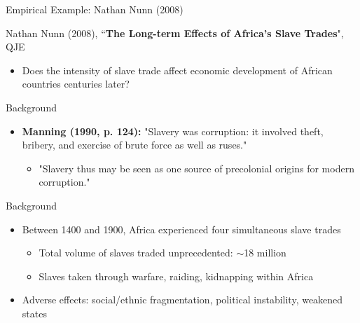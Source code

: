 \documentclass[dvipsnames,hyperref={pdfpagelabels=false}]{beamer}
\begin{document}





\date
{}


\begin{frame}{}
\titlepage
\end{frame}



\begin{frame}{Empirical Example: Nathan Nunn (2008)}

Nathan Nunn (2008), ``\textbf{The Long-term Effects of Africa's Slave Trades}", QJE
					\vspace{0.2cm}
\begin{itemize}
	\item Does the intensity of slave trade affect economic development of African countries centuries later?
\end{itemize}
\end{frame}



	


\begin{frame}{Background}
\begin{itemize}
	\item \textbf{Manning (1990, p. 124):} "Slavery was corruption: it involved theft, bribery, and exercise of brute force as well as ruses."
					\vspace{0.2cm}
					\begin{itemize}
	\item "Slavery thus may be seen as one source of precolonial origins
	for modern corruption."
\end{itemize}
\end{itemize}
\end{frame}


\begin{frame}{Background}
\begin{itemize}
	\item Between 1400 and 1900, Africa experienced four simultaneous slave trades
						\vspace{0.2cm}
									\begin{itemize}		
	\item Total volume of slaves traded unprecedented: $\sim$18 million
						\vspace{0.2cm}
	\item Slaves taken through warfare, raiding, kidnapping within Africa
						\vspace{0.2cm}
	\end{itemize}				
	\item Adverse effects: social/ethnic fragmentation, political instability, weakened states
\end{itemize}
\end{frame}
\end{document}
